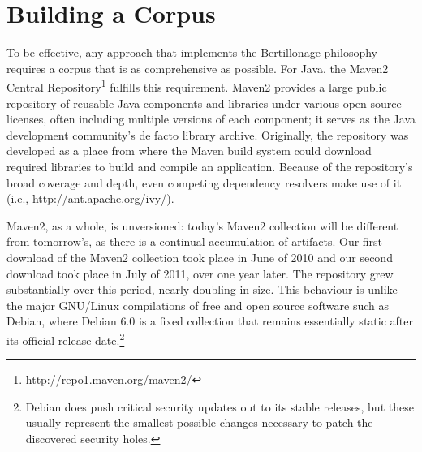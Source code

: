 \label{chapter:Exp}


\section{Building a Corpus}

To be effective, any approach that implements the Bertillonage philosophy
requires a corpus that is as comprehensive as possible. For Java, the
Maven2 Central Repository\footnote{http://repo1.maven.org/maven2/} fulfills
this requirement.  Maven2 provides a large public repository of reusable
Java components and libraries under various open source licenses, often
including multiple versions of each component; it serves as the Java
development community's de facto library archive.  Originally, the
repository was developed as a place from where the Maven build system could
download required libraries to build and compile an application.   Because
of the repository's broad coverage and depth, even competing dependency
resolvers make use of it (i.e., http://ant.apache.org/ivy/).

Maven2, as a whole, is unversioned: today's Maven2 collection will be
different from tomorrow's, as there is a continual accumulation of
artifacts.  Our first download of the Maven2 collection took place in June
of 2010 and our second download took place in July of 2011, over one year
later.  The repository grew substantially over this period, nearly doubling
in size.  This behaviour is unlike the major GNU/Linux compilations of free
and open source software such as Debian, where Debian 6.0 is a fixed
collection that remains essentially static
after its official release date.\footnote{
Debian does push critical security updates out to its stable releases,
but these usually represent the smallest possible changes necessary to patch
the discovered security holes.}





